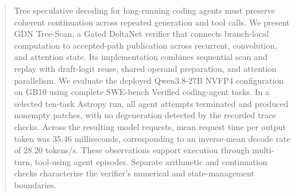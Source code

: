 \begin{abstract}
Tree speculative decoding for long-running coding agents must preserve coherent continuation across repeated generation and tool calls. We present GDN Tree-Scan, a Gated DeltaNet verifier that connects branch-local computation to accepted-path publication across recurrent, convolution, and attention state. Its implementation combines sequential scan and replay with draft-logit reuse, shared operand preparation, and attention parallelism. We evaluate the deployed Qwen3.8-27B NVFP4 configuration on GB10 using complete SWE-bench Verified coding-agent tasks. In a selected ten-task Astropy run, all agent attempts terminated and produced nonempty patches, with no degeneration detected by the recorded trace checks. Across the resulting model requests, mean request time per output token was 35.46 milliseconds, corresponding to an inverse-mean decode rate of 28.20 tokens/s. These observations support execution through multi-turn, tool-using agent episodes. Separate arithmetic and continuation checks characterize the verifier's numerical and state-management boundaries.
\end{abstract}
